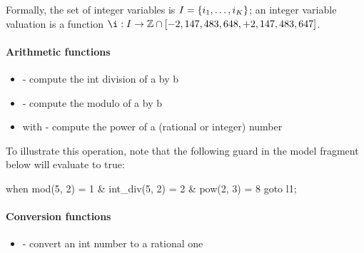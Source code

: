 Formally, the set of integer variables is $I = \{ i_1, \dots, i_K \} $;
an integer variable valuation is a function $\ival : \IVar \rightarrow \setZ \cap \left[-2,147,483,648, +2,147,483,647\right]$.



\paragraph{Arithmetic functions}

\begin{itemize}
	\item \label{item:lbl-int_div}  - compute the int division of a by b
\end{itemize}

\begin{itemize}
	\item \label{item:lbl-mod}  - compute the modulo of a by b
\end{itemize}

\begin{itemize}
    \item \label{item:lbl-pow}  with  - compute the power of a (rational or integer) number
\end{itemize}

\begin{example}
	To illustrate this operation, note that the following guard in the model fragment below will evaluate to true:

	\begin{IMITATORmodel}
		when mod(5, 2) = 1 & int_div(5, 2) = 2 & pow(2, 3) = 8 goto l1;
	\end{IMITATORmodel}
\end{example}

\paragraph{Conversion functions}

\begin{itemize}
    \item \label{item:lbl-rational_of_int}  - convert an int number to a rational one
\end{itemize}

